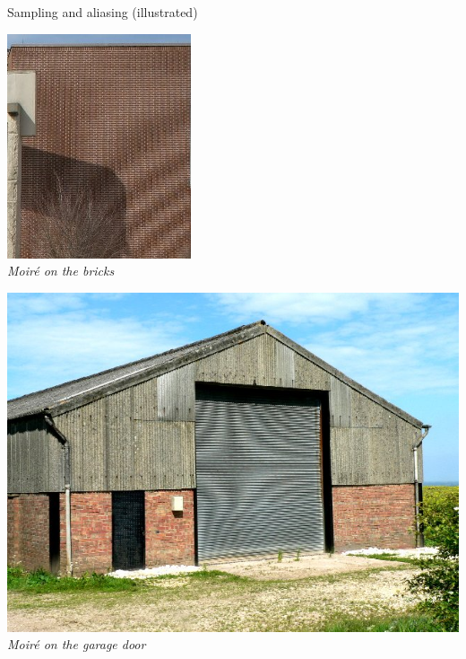 \begin{frame}{Sampling and aliasing (illustrated)}
\begin{minipage}[b]{0.29\textwidth}
    \includegraphics[width=\textwidth]{slides/graphics-theory/bricks-alias.jpg}\\
    \textit{\small Moiré on the bricks}
  \end{minipage}
  \hfill
  \begin{minipage}[b]{0.29\textwidth}
    \centering
    \includegraphics[width=\textwidth]{slides/graphics-theory/moire.jpg}\\
    \textit{\small Moiré on the garage door}
  \end{minipage}
\end{frame}

